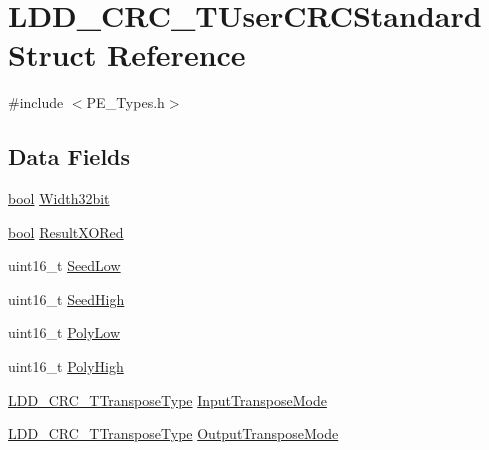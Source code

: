 \hypertarget{struct_l_d_d___c_r_c___t_user_c_r_c_standard}{}\section{L\+D\+D\+\_\+\+C\+R\+C\+\_\+\+T\+User\+C\+R\+C\+Standard Struct Reference}
\label{struct_l_d_d___c_r_c___t_user_c_r_c_standard}


{\ttfamily \#include $<$P\+E\+\_\+\+Types.\+h$>$}

\subsection*{Data Fields}
\begin{DoxyCompactItemize}
\item 
\hyperlink{group___p_e___types__module_ga97a80ca1602ebf2303258971a2c938e2}{bool} \hyperlink{struct_l_d_d___c_r_c___t_user_c_r_c_standard_a0e258829d0f26422c6c5b7cbee477436}{Width32bit}
\item 
\hyperlink{group___p_e___types__module_ga97a80ca1602ebf2303258971a2c938e2}{bool} \hyperlink{struct_l_d_d___c_r_c___t_user_c_r_c_standard_a20b7dcf94ad62db3a368430c9c720445}{Result\+X\+O\+Red}
\item 
uint16\+\_\+t \hyperlink{struct_l_d_d___c_r_c___t_user_c_r_c_standard_ac779d63a1161d691d29250358df9a10e}{Seed\+Low}
\item 
uint16\+\_\+t \hyperlink{struct_l_d_d___c_r_c___t_user_c_r_c_standard_ac421ddf1959ec9b317ccdcd3243c6bc5}{Seed\+High}
\item 
uint16\+\_\+t \hyperlink{struct_l_d_d___c_r_c___t_user_c_r_c_standard_a35be29d969daa6d87983d1131e271254}{Poly\+Low}
\item 
uint16\+\_\+t \hyperlink{struct_l_d_d___c_r_c___t_user_c_r_c_standard_a1b6b20f464bfc54f267270f527a23d58}{Poly\+High}
\item 
\hyperlink{group___p_e___types__module_ga9dc2d6e80cf609a571ea020e1d0c4934}{L\+D\+D\+\_\+\+C\+R\+C\+\_\+\+T\+Transpose\+Type} \hyperlink{struct_l_d_d___c_r_c___t_user_c_r_c_standard_aafcfb2142cff39d54ba2a4548caf37c0}{Input\+Transpose\+Mode}
\item 
\hyperlink{group___p_e___types__module_ga9dc2d6e80cf609a571ea020e1d0c4934}{L\+D\+D\+\_\+\+C\+R\+C\+\_\+\+T\+Transpose\+Type} \hyperlink{struct_l_d_d___c_r_c___t_user_c_r_c_standard_a1bfeb8c16e67ef1c8032166ab592afe6}{Output\+Transpose\+Mode}
\end{DoxyCompactItemize}


